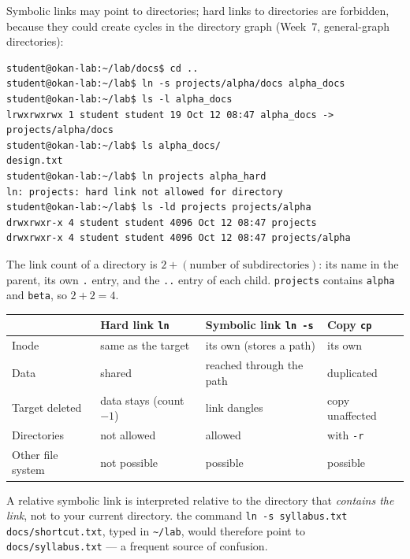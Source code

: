 \documentclass[11pt,a4paper]{article}
\newcommand{\cmd}[1]{\texttt{#1}}
\begin{document}
Symbolic links may point to directories; hard links to directories are forbidden, because they could create cycles in the directory graph (Week~7, general-graph directories):

\begin{lstlisting}[style=term]
student@okan-lab:~/lab/docs$ cd ..
student@okan-lab:~/lab$ ln -s projects/alpha/docs alpha_docs
student@okan-lab:~/lab$ ls -l alpha_docs
lrwxrwxrwx 1 student student 19 Oct 12 08:47 alpha_docs -> projects/alpha/docs
student@okan-lab:~/lab$ ls alpha_docs/
design.txt
student@okan-lab:~/lab$ ln projects alpha_hard
ln: projects: hard link not allowed for directory
student@okan-lab:~/lab$ ls -ld projects projects/alpha
drwxrwxr-x 4 student student 4096 Oct 12 08:47 projects
drwxrwxr-x 4 student student 4096 Oct 12 08:47 projects/alpha
\end{lstlisting}

The link count of a directory is $2 + (\text{number of subdirectories})$: its name in the parent, its own \texttt{.} entry, and the \texttt{..} entry of each child. \texttt{projects} contains \texttt{alpha} and \texttt{beta}, so $2 + 2 = 4$.

\begin{center}
\renewcommand{\arraystretch}{1.2}
\begin{tabularx}{\linewidth}{l >{\raggedright\arraybackslash}X >{\raggedright\arraybackslash}X >{\raggedright\arraybackslash}X}
\toprule
 & \textbf{Hard link \cmd{ln}} & \textbf{Symbolic link \cmd{ln -s}} & \textbf{Copy \cmd{cp}} \\
\midrule
Inode & same as the target & its own (stores a path) & its own \\
Data & shared & reached through the path & duplicated \\
Target deleted & data stays (count $-1$) & link dangles & copy unaffected \\
Directories & not allowed & allowed & with \cmd{-r} \\
Other file system & not possible & possible & possible \\
\bottomrule
\end{tabularx}
\end{center}

A relative symbolic link is interpreted relative to the directory that \emph{contains the link}, not to your current directory. the command \texttt{ln -s syllabus.txt} \texttt{docs/shortcut.txt}, typed in \texttt{\textasciitilde/lab}, would therefore point to \texttt{docs/syllabus.txt} --- a frequent source of confusion.
\end{document}

